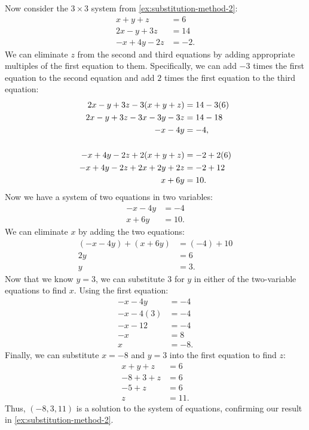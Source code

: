 \documentclass{article}
\begin{document}
\begin{example}\label{ex:elimination-method-2}
    Now consider the \(3\times 3\) system from \cref{ex:substitution-method-2}:
\begin{align*}
    x+y+z&=6 \\
    2x-y+3z&=14 \\
    -x+4y-2z&=-2.
\end{align*}
We can eliminate \(z\) from the second and third equations by adding appropriate multiples of the first equation to them. Specifically, we can add \(-3\) times the first equation to the second equation and add \(2\) times the first equation to the third equation:
\begin{align*}
    2x-y+3z-3(x+y+z)&=14-3(6) \\
    2x-y+3z-3x-3y-3z&=14-18 \\
    -x-4y&=-4, \\[\baselineskip]
    -x+4y-2z+2(x+y+z)&=-2+2(6) \\
    -x+4y-2z+2x+2y+2z&=-2+12 \\
    x+6y&=10.
\end{align*}
Now we have a system of two equations in two variables:
\begin{align*}
    -x-4y&=-4 \\
    x+6y&=10.
\end{align*}
We can eliminate \(x\) by adding the two equations:
\begin{align*}
    (-x-4y)+(x+6y)&=(-4)+10 \\
    2y&=6 \\
    y&=3.
\end{align*}
Now that we know \(y=3\), we can substitute \(3\) for \(y\) in either of the two-variable equations to find \(x\). Using the first equation:
\begin{align*}
    -x-4y&=-4 \\
    -x-4(3)&=-4 \\
    -x-12&=-4 \\
    -x&=8 \\
    x&=-8.
\end{align*}
Finally, we can substitute \(x=-8\) and \(y=3\) into the first equation to find \(z\):
\begin{align*}
    x+y+z&=6 \\
    -8+3+z&=6 \\
    -5+z&=6 \\
    z&=11.
\end{align*}
Thus, \((-8, 3, 11)\) is a solution to the system of equations, confirming our result in \cref{ex:substitution-method-2}.
\end{example}
\end{document}
